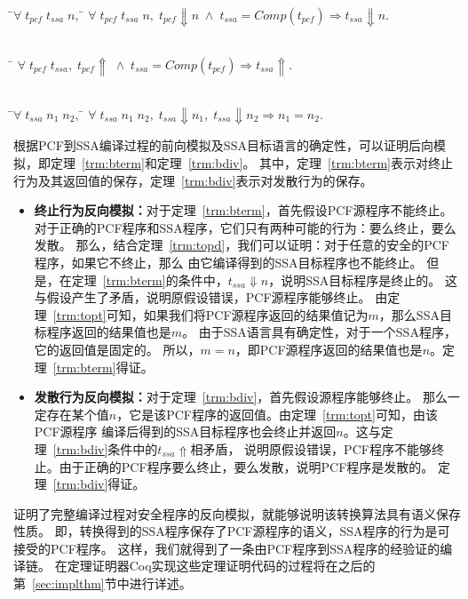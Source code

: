   \begin{theorem}[SSA程序对PCF程序终止行为的保存]\label{trm:topt} 
    \begin{tabbing}
     \\
    \quad\=$\forall \; t_{pcf}\; t_{ssa}\; n,\; $\=\kill
    \>$\forall \; t_{pcf}\; t_{ssa}\; n,\; t_{pcf}\Downarrow n\; \wedge \; t_{ssa}=Comp(t_{pcf}) \Longrightarrow t_{ssa}\Downarrow n.$
    \end{tabbing}
  \end{theorem}
  
  \begin{theorem}[SSA程序对PCF程序发散行为的保存]\label{trm:topd}
    \begin{tabbing}
      \\
    \quad\=\kill
    \>$\forall \; t_{pcf}\; t_{ssa},\; t_{pcf}\Uparrow\; \wedge \; t_{ssa}=Comp(t_{pcf})\Longrightarrow t_{ssa}\Uparrow.$
    \end{tabbing}
  \end{theorem}  

  \begin{theorem}[SSA语言的确定性]\label{trm:ssadeter} 
    \begin{tabbing}
     \\
    \quad\=$\forall \; t_{ssa}\; n_1\; n_2,\; $\=\kill
    \>$\forall \; t_{ssa}\; n_1\; n_2,\; t_{ssa}\Downarrow n_1,\; t_{ssa}\Downarrow n_2 \Longrightarrow n_1 = n_2.$
    \end{tabbing}
  \end{theorem}

根据PCF到SSA编译过程的前向模拟及SSA目标语言的确定性，可以证明后向模拟，即定理~\ref{trm:bterm}和定理~\ref{trm:bdiv}。
其中，定理~\ref{trm:bterm}表示对终止行为及其返回值的保存，定理~\ref{trm:bdiv}表示对发散行为的保存。

\begin{itemize}
  \item \textbf{终止行为反向模拟：}对于定理~\ref{trm:bterm}，首先假设PCF源程序不能终止。
    对于正确的PCF程序和SSA程序，它们只有两种可能的行为：要么终止，要么发散。
    那么，结合定理~\ref{trm:topd}，我们可以证明：对于任意的安全的PCF程序，如果它不终止，那么
    由它编译得到的SSA目标程序也不能终止。
    但是，在定理~\ref{trm:bterm}的条件中，$t_{ssa}\Downarrow n$，说明SSA目标程序是终止的。
    这与假设产生了矛盾，说明原假设错误，PCF源程序能够终止。
    由定理~\ref{trm:topt}可知，如果我们将PCF源程序返回的结果值记为$m$，那么SSA目标程序返回的结果值也是$m$。
    由于SSA语言具有确定性，对于一个SSA程序，它的返回值是固定的。
    所以，$m=n$，即PCF源程序返回的结果值也是$n$。定理~\ref{trm:bterm}得证。
  \item \textbf{发散行为反向模拟：}对于定理~\ref{trm:bdiv}，首先假设源程序能够终止。
    那么一定存在某个值$n$，它是该PCF程序的返回值。由定理~\ref{trm:topt}可知，由该PCF源程序
    编译后得到的SSA目标程序也会终止并返回$n$。这与定理~\ref{trm:bdiv}条件中的$t_{ssa}\Uparrow$相矛盾，
    说明原假设错误，PCF程序不能够终止。由于正确的PCF程序要么终止，要么发散，说明PCF程序是发散的。
    定理~\ref{trm:bdiv}得证。
\end{itemize}

证明了完整编译过程对安全程序的反向模拟，就能够说明该转换算法具有语义保存性质。
即，转换得到的SSA程序保存了PCF源程序的语义，SSA程序的行为是可接受的PCF程序。
这样，我们就得到了一条由PCF程序到SSA程序的经验证的编译链。
在定理证明器Coq实现这些定理证明代码的过程将在之后的第~\ref{sec:implthm}节中进行详述。
